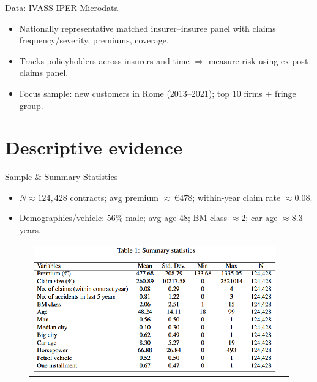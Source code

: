 \documentclass[10pt,aspectratio=169]{beamer}
\begin{document}
\begin{frame}{Data: IVASS IPER Microdata}
\justifying
\begin{itemize}
  \item Nationally representative matched insurer--insuree panel with claims frequency/severity, premiums, coverage.
  \item Tracks policyholders across insurers and time $\Rightarrow$ measure risk using ex-post claims panel.
  \item Focus sample: new customers in Rome (2013--2021); top 10 firms + fringe group.
\end{itemize}
\end{frame}

\section{Descriptive evidence}

\begin{frame}{Sample \& Summary Statistics}
\justifying
\begin{itemize}
  \item $N \approx 124{,}428$ contracts; avg premium $\approx \,€478$; within-year claim rate $\approx 0.08$.
  \item Demographics/vehicle: 56\% male; avg age 48; BM class $\approx 2$; car age $\approx 8.3$ years.
\end{itemize}
\begin{figure}[H]
\centering{}%
\begin{tabular}{cc}
\includegraphics[scale=0.45]{Figures/Tab1.png}
\end{tabular}
\end{figure}
\end{frame}
\end{document}
